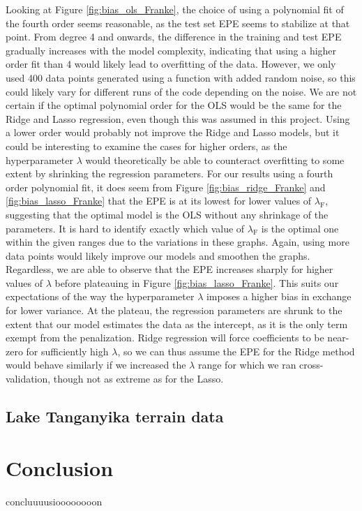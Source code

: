 \documentclass[a4paper, 10pt]{article}
\begin{document}
\begin{multicols}{2}
Looking at Figure \ref{fig:bias_ols_Franke}, the choice of using a polynomial fit of the fourth order seems reasonable, as the test set EPE seems to stabilize at that point. From degree 4 and onwards, the difference in the training and test EPE gradually increases with  the model complexity, indicating that using a higher order fit than 4 would likely lead to overfitting of the data. However, we only used 400 data points generated using a function with added random noise, so this could likely vary for different runs of the code depending on the noise.  We are not certain if the optimal polynomial order for the OLS would be the same for the Ridge and Lasso regression, even though this was assumed in this project. Using a lower order would probably not improve the Ridge and Lasso models, but it could be interesting to examine the cases for higher orders, as the hyperparameter $\lambda$ would theoretically be able to counteract overfitting to some extent by shrinking the regression parameters.  For our results using a fourth order polynomial fit, it does seem from Figure \ref{fig:bias_ridge_Franke} and \ref{fig:bias_lasso_Franke} that the EPE is at its lowest for lower values of $\lambda_\text{F}$, suggesting that the optimal model is the OLS without any shrinkage of the parameters. It is hard to identify exactly which value of $\lambda_\text{F}$ is the optimal one within the given ranges due to the variations in these graphs. Again, using more data points would likely improve our models and smoothen the graphs.  Regardless, we are able to observe that the EPE increases sharply for higher values of $\lambda$ before plateauing in Figure \ref{fig:bias_lasso_Franke}. This suits our expectations of the way the hyperparameter $\lambda$ imposes a higher bias in exchange for lower variance. At the plateau, the regression parameters are shrunk to the extent that our model estimates the data as the intercept, as it is the only term exempt from the penalization. Ridge regression will force coefficients to be near-zero for sufficiently high $\lambda$, so we can thus assume the EPE for the Ridge method would behave similarly  if we increased the $\lambda$ range for which we ran cross-validation, though not as extreme as for the Lasso.


\subsection{Lake Tanganyika terrain data}

\section{Conclusion}
concluuuusioooooooon





\end{multicols}
\end{document}
